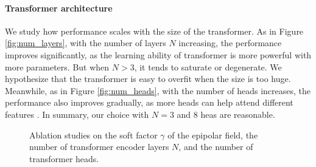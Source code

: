\documentclass{bmvc2k}
\begin{document}
\vspace{-1.0 em}
\paragraph{Transformer architecture} We study how performance scales with the size of the transformer. As in Figure \ref{fig:num_layers}, with the number of layers $N$ increasing, the performance improves significantly, as the learning ability of transformer is more powerful with more parameters. 
But when $N>3$, it tends to saturate or degenerate. We hypothesize that the transformer is easy to overfit when the size is too huge. 
Meanwhile, as in Figure \ref{fig:num_heads},  with the number of heads increases, the performance also improves gradually, as more heads can help attend different features \cite{vaswani2017attention}.  
In summary, our choice with $N=3$ and 8 heas are reasonable. 


\begin{figure}[h]
\centering  
{}
\vspace{-1.0em}
\caption{ \small{Ablation studies on the soft factor $\gamma$ of the epipolar field, the number of transformer encoder layers $N$, and the number of transformer heads.}}
\vspace{-0.5em}
\end{figure}





\begin{table}[ht!]
\centering
{}
\vspace{-1em}
\caption{\footnotesize{2D and 3D pose estimation accuracy comparison on Ski-Pose.} }
\label{tab:skipose}
\end{table}
\end{document}
